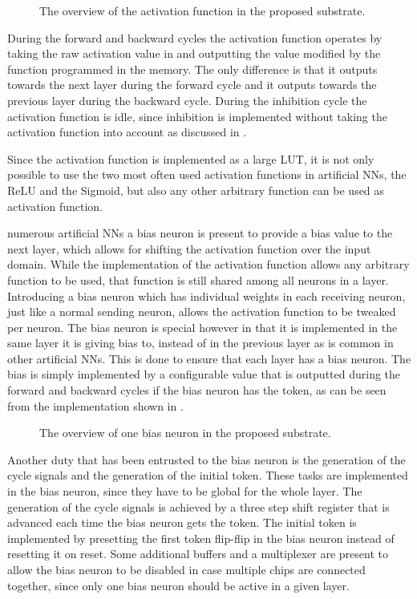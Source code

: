 \begin{figure}[!ht]
  \centering
  
  \caption{The overview of the activation function in the proposed substrate.}
  \label{fig:activation}
\end{figure}

During the forward and backward cycles the activation function operates by taking the raw activation value in and outputting the value modified by the function programmed in the memory. The only difference is that it outputs towards the next layer during the forward cycle and it outputs towards the previous layer during the backward cycle. During the inhibition cycle the activation function is idle, since inhibition is implemented without taking the activation function into account as discussed in .

Since the activation function is implemented as a large \ac{LUT}, it is not only possible to use the two most often used activation functions in artificial \acp{NN}, the \ac{ReLU} and the Sigmoid\cite{8192463}, but also any other arbitrary function can be used as activation function.

 numerous artificial \acp{NN} a bias neuron is present to provide a bias value to the next layer, which allows for shifting the activation function over the input domain. While the implementation of the activation function allows any arbitrary function to be used, that function is still shared among all neurons in a layer. Introducing a bias neuron which has individual weights in each receiving neuron, just like a normal sending neuron, allows the activation function to be tweaked per neuron. The bias neuron is special however in that it is implemented in the same layer it is giving bias to, instead of in the previous layer as is common in other artificial \acp{NN}. This is done to ensure that each layer has a bias neuron. The bias is simply implemented by a configurable value that is outputted during the forward and backward cycles if the bias neuron has the token, as can be seen from the implementation shown in .

\begin{figure}[!ht]
  \centering
  
  \caption{The overview of one bias neuron in the proposed substrate.}
  \label{fig:bias}
\end{figure}

Another duty that has been entrusted to the bias neuron is the generation of the cycle signals and the generation of the initial token. These tasks are implemented in the bias neuron, since they have to be global for the whole layer. The generation of the cycle signals is achieved by a three step shift register that is advanced each time the bias neuron gets the token. The initial token is implemented by presetting the first token flip-flip in the bias neuron instead of resetting it on reset. Some additional buffers and a multiplexer are present to allow the bias neuron to be disabled in case multiple chips are connected together, since only one bias neuron should be active in a given layer.
